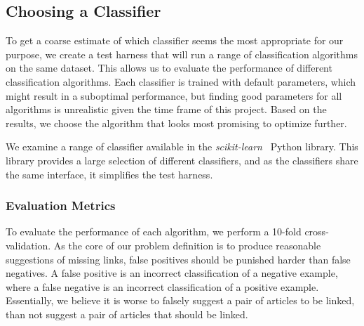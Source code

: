 



\subsection{Choosing a Classifier}\label{choosing_classifier}
To get a coarse estimate of which classifier seems the most appropriate for our purpose, we create a test harness that will run a range of classification algorithms on the same dataset. This allows us to evaluate the performance of different classification algorithms. Each classifier is trained with default parameters, which might result in a suboptimal performance, but finding good parameters for all algorithms is unrealistic given the time frame of this project. Based on the results, we choose the algorithm that looks most promising to optimize further.

We examine a range of classifier available in the \emph{scikit-learn}~\cite{scikit-learn} Python library. This library provides a large selection of different classifiers, and as the classifiers share the same interface, it simplifies the test harness.

\subsubsection{Evaluation Metrics}\label{evaluation_metric}
To evaluate the performance of each algorithm, we perform a 10-fold cross-validation. As the core of our problem definition is to produce reasonable suggestions of missing links, false positives should be punished harder than false negatives. A false positive is an incorrect classification of a negative example, where a false negative is an incorrect classification of a positive example. Essentially, we believe it is worse to falsely suggest a pair of articles to be linked, than not suggest a pair of articles that should be linked.

